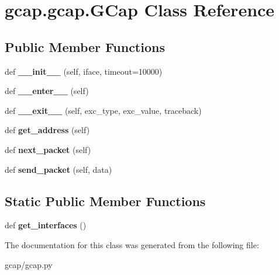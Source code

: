 \hypertarget{classgcap_1_1gcap_1_1_g_cap}{}\section{gcap.\+gcap.\+G\+Cap Class Reference}
\label{classgcap_1_1gcap_1_1_g_cap}
\subsection*{Public Member Functions}
\begin{DoxyCompactItemize}
\item 
\mbox{\label{classgcap_1_1gcap_1_1_g_cap_a723bc430b00d782c971562e23e038a47}} 
def {\bfseries \+\_\+\+\_\+init\+\_\+\+\_\+} (self, iface, timeout=10000)
\item 
\mbox{\label{classgcap_1_1gcap_1_1_g_cap_a85c3448fbbb2769848423fc92d29d671}} 
def {\bfseries \+\_\+\+\_\+enter\+\_\+\+\_\+} (self)
\item 
\mbox{\label{classgcap_1_1gcap_1_1_g_cap_a5151dab710a6565d592983fbaae171aa}} 
def {\bfseries \+\_\+\+\_\+exit\+\_\+\+\_\+} (self, exc\+\_\+type, exc\+\_\+value, traceback)
\item 
\mbox{\label{classgcap_1_1gcap_1_1_g_cap_a0fb575e68604ce8a75843569428ddac9}} 
def {\bfseries get\+\_\+address} (self)
\item 
\mbox{\label{classgcap_1_1gcap_1_1_g_cap_aa9f83853e9e47fb02449528d0a5fcdfb}} 
def {\bfseries next\+\_\+packet} (self)
\item 
\mbox{\label{classgcap_1_1gcap_1_1_g_cap_a5d5817d65ed15cd12fddc7de606339df}} 
def {\bfseries send\+\_\+packet} (self, data)
\end{DoxyCompactItemize}
\subsection*{Static Public Member Functions}
\begin{DoxyCompactItemize}
\item 
\mbox{\label{classgcap_1_1gcap_1_1_g_cap_a0c22b7de73ea578fa88564e5c7f1af3c}} 
def {\bfseries get\+\_\+interfaces} ()
\end{DoxyCompactItemize}


The documentation for this class was generated from the following file\+:\begin{DoxyCompactItemize}
\item 
gcap/gcap.\+py\end{DoxyCompactItemize}
